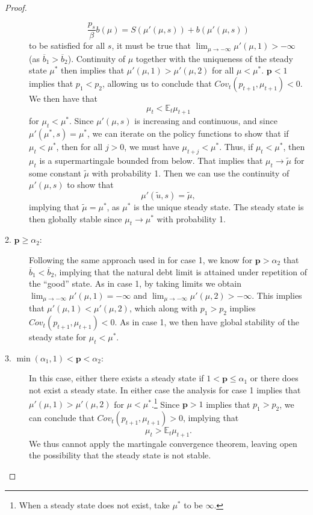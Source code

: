 \documentclass[12pt]{article}
\newcommand{\apb}[1]{\textcolor{magenta}{$^{\textrm{apb}}${#1}}}
\newcommand{\EE}{\mathbb E}
\begin{document}
\begin{proof}
\begin{description}
	\[
		\frac{p_s}{\beta}b(\mu) = S(\mu'(\mu,s))+b(\mu'(\mu,s))
	\] to be satisfied for all $s$, it must be true that $\lim_{\mu\rightarrow -\infty} \mu'(\mu,1) >-\infty$ (as $\overline b_1 > \overline b_2$).  Continuity of $\mu$ together with the uniqueness of the steady state $\mu^*$ then implies that $\mu'(\mu,1) > \mu'(\mu,2)$ for all $\mu < \mu^*$.
	$\bm p < 1$ implies that $p_1 < p_2$, allowing us to conclude that $Cov_t(p_{t+1},\mu_{t+1}) < 0$.  We then have that
	\[
		\mu_t < \EE_t\mu_{t+1}
	\] for $\mu_t < \mu^*$.  Since $\mu'(\mu,s)$ is increasing and  continuous, and since $\mu'(\mu^*,s) = \mu^*$, we can iterate on the policy functions to show that if $\mu_t < \mu^*$, then for all $j> 0$, we must have $\mu_{t+j} <\mu^*$.  Thus, if $\mu_t <\mu^*$, then $\mu_t$ is a supermartingale bounded from below. That implies  that $\mu_t\rightarrow \tilde\mu$ for some constant $\tilde\mu$ with probability 1.  Then  we
can use  the continuity of $\mu'(\mu,s)$ to show that
	\[
		\mu'(\tilde u,s) = \tilde \mu,
	\] implying that $\tilde \mu =\mu^*$, as $\mu^*$ is the unique steady state.  The steady state is then globally stable since $\mu_t \rightarrow \mu^*$ with probability 1.
	\item[2. $\bm p \geq \alpha_2$:]  Following the same approach used  in for case 1, we know for $\bm p > \alpha_2$ that $\overline b_1 < \overline b_2$, implying that the natural debt limit is attained under repetition of  the ``good'' state.  As in case 1,  by taking limits we obtain $\lim_{\mu\rightarrow-\infty} \mu'(\mu,1) = -\infty$ and $\lim_{\mu\rightarrow-\infty}\mu'(\mu,2) > -\infty$.  This implies that $\mu'(\mu,1) < \mu'(\mu,2)$, which along with $p_1 > p_2$ implies $Cov_t(p_{t+1},\mu_{t+1}) <0$.  As in case 1, we then have global stability of the steady state for $\mu_t < \mu^*$.
	\item[3. $\min(\alpha_1,1) < \bm p < \alpha_2$:]   In this case, either there exists a steady state if $1 < \bm p \leq \alpha_1$ or there does not exist a steady state.  In either case the analysis for case 1 implies that $\mu'(\mu,1) > \mu'(\mu,2)$ for $\mu < \mu ^*$.\footnote{When
 a steady state does not exist, take $\mu^*$ to be $\infty$.}  Since $\bm p >1$ implies that $p_1 > p_2$, we can  conclude that $Cov_t(p_{t+1},\mu_{t+1}) > 0$, implying that
	\[
		\mu_t > \EE_t \mu_{t+1}.
	\]We thus cannot apply the martingale convergence theorem, leaving open the possibility that the steady state is not stable.
\end{description}
\end{proof}
\end{document}
